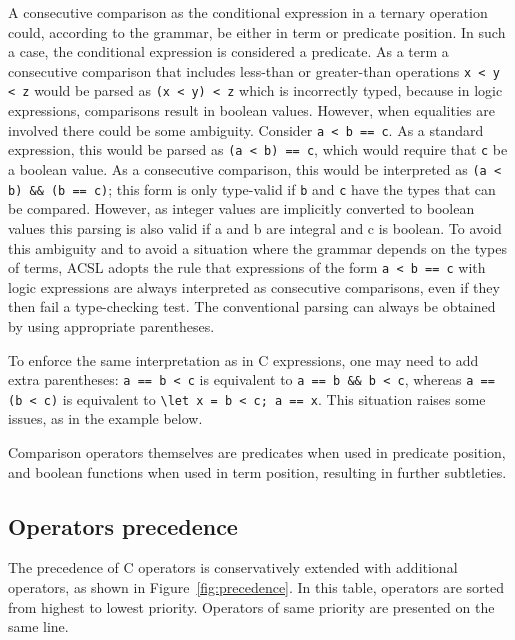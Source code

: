   A consecutive comparison as the conditional expression in a ternary operation could, according to the grammar, be either in term or 
  predicate position. In such a case, the conditional expression is
  considered a predicate. As a term a consecutive comparison that includes less-than or greater-than operations
  \lstinline|x < y < z| would
  be parsed as \lstinline|(x < y) < z| which is incorrectly typed, 
  because in logic expressions, comparisons result in boolean values. 
  However, when equalities are involved there could be some ambiguity.
  Consider \lstinline|a < b == c|. As a standard expression, this would be parsed as
  \lstinline|(a < b) == c|, which would require that \lstinline|c| be a boolean value.
  As a consecutive comparison, this would be interpreted as 
  \lstinline|(a < b) && (b == c)|; this form is only type-valid if \lstinline|b| and
  \lstinline|c| have the types that can be compared. However, as integer values are
  implicitly converted to boolean values this parsing is also valid if a and b are integral and c is boolean.
  To avoid this ambiguity and to avoid a situation where the grammar depends on the types of terms,
  ACSL adopts the rule that expressions of the form \lstinline|a < b == c| with logic expressions
  are always interpreted as consecutive comparisons, even if they then fail a type-checking test.
  The conventional parsing can always be obtained by using appropriate parentheses.

  To enforce the same interpretation as in C expressions, one may need
  to add extra parentheses: \lstinline|a == b < c| is equivalent
  to \lstinline|a == b && b < c|, whereas
  \lstinline |a == (b < c)| is
  equivalent to \lstinline|\let x = b < c; a == x|.
  This situation raises some issues, as in the example below.


Comparison operators themselves are
predicates when used in predicate position, and boolean functions when
used in term position, resulting in further subtleties.
\begin{example}

\end{example}

\subsection{Operators precedence}

The precedence of C operators is conservatively extended with
additional operators, as shown in Figure~\ref{fig:precedence}. In this
table, operators are sorted from highest to lowest priority. Operators
of same priority are presented on the same line.


